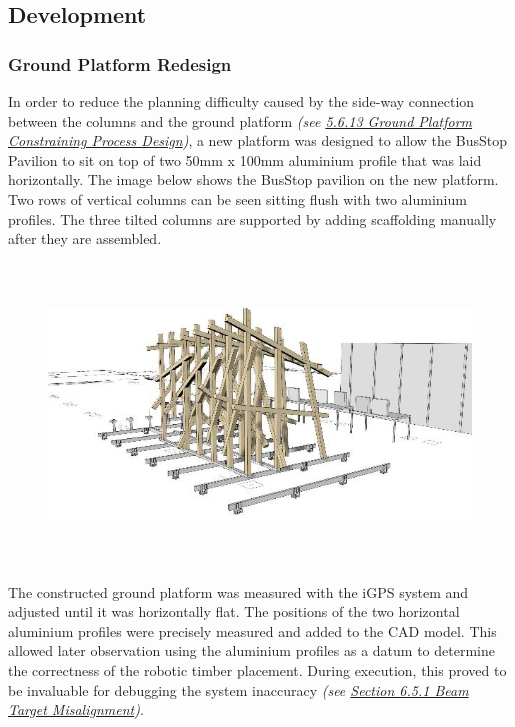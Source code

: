 \documentclass[11pt]{book}
\begin{document}
\subsection{Development}

\subsubsection{Ground Platform Redesign}

In order to reduce the planning difficulty caused by the side-way connection between the columns and the ground platform \textit{\textcolor[HTML]{B7B7B7}{(see \uline{5.6.13 Ground Platform Constraining Process Design})}}, a new platform was designed to allow the BusStop Pavilion to sit on top of two 50mm x 100mm aluminium profile that was laid horizontally. The image below shows the BusStop pavilion on the new platform. Two rows of vertical columns can be seen sitting flush with two aluminium profiles. The three tilted columns are supported by adding scaffolding manually after they are assembled.

\begin{figure}[H]
\includegraphics[width=15.92cm,height=7.97cm]{./images/image1.jpeg}
\end{figure}


The constructed ground platform was measured with the iGPS system and adjusted until it was horizontally flat. The positions of the two horizontal aluminium profiles were precisely measured and added to the CAD model. This allowed later observation using the aluminium profiles as a datum to determine the correctness of the robotic timber placement. During execution, this proved to be invaluable for debugging the system inaccuracy \textit{\textcolor[HTML]{B7B7B7}{(see \uline{Section 6.5.1 Beam Target Misalignment})}}.
\end{document}
